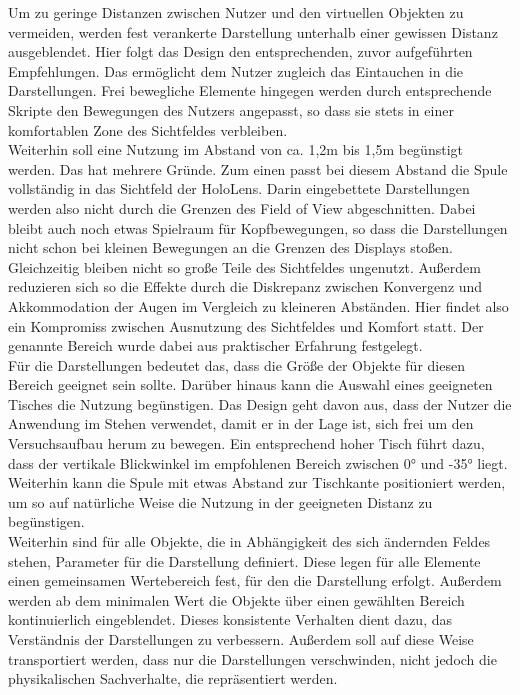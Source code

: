 Um zu geringe Distanzen zwischen Nutzer und den virtuellen Objekten zu vermeiden, werden fest verankerte Darstellung unterhalb einer gewissen Distanz ausgeblendet. Hier folgt das Design den entsprechenden, zuvor aufgeführten Empfehlungen. Das ermöglicht dem Nutzer zugleich das Eintauchen in die Darstellungen. Frei bewegliche Elemente hingegen werden durch entsprechende Skripte den Bewegungen des Nutzers angepasst, so dass sie stets in einer komfortablen Zone des Sichtfeldes verbleiben.\\

Weiterhin soll eine Nutzung im Abstand von ca. 1,2m bis 1,5m begünstigt werden. Das hat mehrere Gründe. Zum einen passt bei diesem Abstand die Spule vollständig in das Sichtfeld der HoloLens. Darin eingebettete Darstellungen werden also nicht durch die Grenzen des Field of View abgeschnitten. Dabei bleibt auch noch etwas Spielraum für Kopfbewegungen, so dass die Darstellungen nicht schon bei kleinen Bewegungen an die Grenzen des Displays stoßen. Gleichzeitig bleiben nicht so große Teile des Sichtfeldes ungenutzt. Außerdem reduzieren sich so die Effekte durch die Diskrepanz zwischen Konvergenz und Akkommodation der Augen im Vergleich zu kleineren Abständen. Hier findet also ein Kompromiss zwischen Ausnutzung des Sichtfeldes und Komfort statt. Der genannte Bereich wurde dabei aus praktischer Erfahrung festgelegt.\\

Für die Darstellungen bedeutet das, dass die Größe der Objekte für diesen Bereich geeignet sein sollte. Darüber hinaus kann die Auswahl eines geeigneten Tisches die Nutzung begünstigen. Das Design geht davon aus, dass der Nutzer die Anwendung im Stehen verwendet, damit er in der Lage ist, sich frei um den Versuchsaufbau herum zu bewegen. Ein entsprechend hoher Tisch führt dazu, dass der vertikale Blickwinkel im empfohlenen Bereich zwischen 0° und -35° liegt. Weiterhin kann die Spule mit etwas Abstand zur Tischkante positioniert werden, um so auf natürliche Weise die Nutzung in der geeigneten Distanz zu begünstigen.\\

Weiterhin sind für alle Objekte, die in Abhängigkeit des sich ändernden Feldes stehen, Parameter für die Darstellung definiert. Diese legen für alle Elemente einen gemeinsamen Wertebereich fest, für den die Darstellung erfolgt. Außerdem werden ab dem minimalen Wert die Objekte über einen gewählten Bereich kontinuierlich eingeblendet. Dieses konsistente Verhalten dient dazu, das Verständnis der Darstellungen zu verbessern. Außerdem soll auf diese Weise transportiert werden, dass nur die Darstellungen verschwinden, nicht jedoch die physikalischen Sachverhalte, die repräsentiert werden.\\

